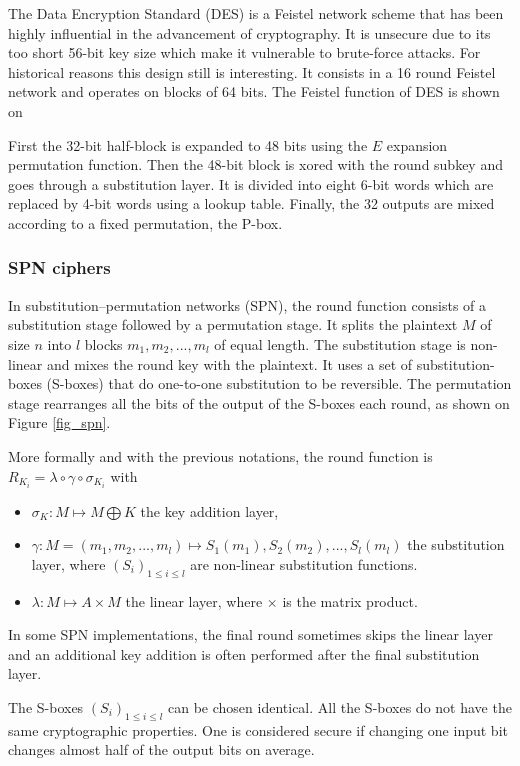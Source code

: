 \documentclass[11pt]{sdm}
\begin{document}
The Data Encryption Standard (DES) is a Feistel network scheme that has been highly influential in the advancement of cryptography.
It is unsecure due to its too short 56-bit key size which make it vulnerable to brute-force attacks.
For historical reasons this design still is interesting.
It consists in a 16 round Feistel network and operates on blocks of 64 bits.
The Feistel function of DES is shown on %

First the 32-bit half-block is expanded to 48 bits using the $E$ expansion permutation function.
Then the 48-bit block is xored with the round subkey and goes through a substitution layer.
It is divided into eight 6-bit words which are replaced by 4-bit words using a lookup table.
Finally, the 32 outputs are mixed according to a fixed permutation, the P-box.


\subsubsection{SPN ciphers}

In substitution–permutation networks (SPN), the round function consists of a substitution stage followed by a permutation stage.
It splits the plaintext $M$ of size $n$ into $l$ blocks $m_1,m_2,...,m_l$ of equal length.
The substitution stage is non-linear and mixes the round key with the plaintext.
It uses a set of substitution-boxes (S-boxes) that do one-to-one substitution to be reversible.
The permutation stage rearranges all the bits of the output of the S-boxes each round, as shown on Figure \ref{fig_spn}.

More formally and with the previous notations, the round function is $R_{K_i} = \lambda \circ \gamma \circ \sigma_{K_i}$ with
\begin{itemize}
    \item $\sigma_{K}:M \mapsto M \bigoplus K$ the key addition layer,
    \item $\gamma : M=(m_1,m_2,...,m_l) \mapsto S_1(m_1),S_2(m_2),...,S_l(m_l)$ the substitution layer, where $(S_i)_{1\leq i \leq l}$ are non-linear substitution functions.
    \item $\lambda : M \mapsto A \times M$ the linear layer, where $\times$ is the matrix product.
\end{itemize}

In some SPN implementations, the final round sometimes skips the linear layer and an additional key addition is often performed after the final substitution layer.

The S-boxes $(S_i)_{1\leq i \leq l}$ can be chosen identical. 
All the S-boxes do not have the same cryptographic properties.
One is considered secure if changing one input bit changes almost half of the output bits on average. %
\end{document}
